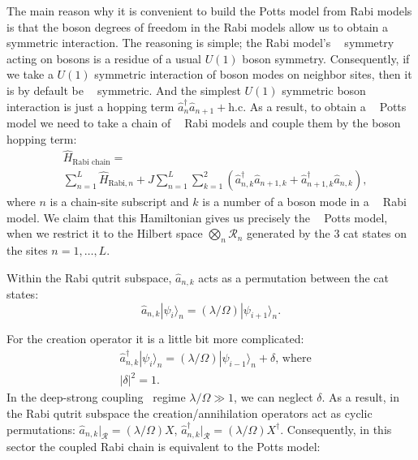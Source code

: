 \documentclass[reprint, aps, prx, amsmath, amssymb, longbibliography, superscriptaddress]{revtex4-2}
\DeclareMathOperator{\Zthree}{\mathbb{Z}_3}
\begin{document}
The main reason why it is convenient to build the Potts model from Rabi models is that the boson degrees of freedom in the Rabi models allow us to obtain a $\Zthree$ symmetric interaction. The reasoning is simple; the Rabi model's $\Zthree$ symmetry acting on bosons is a residue of a usual $U(1)$ boson symmetry. Consequently, if we take a $U(1)$ symmetric interaction of boson modes on neighbor sites, then it is by default be $\Zthree$ symmetric. And the simplest $U(1)$ symmetric boson interaction is just a hopping term $\hat a_n^{\dagger} \hat a_{n+1} + \textrm{h.c.}$ As a result, to obtain a $\Zthree$ Potts model we need to take a chain of $\Zthree$ Rabi models and couple them by the boson hopping term:
\begin{equation}
\label{coupled-rabi}
\begin{aligned}
    &\hat H_{\text{Rabi chain}} = \\
    &\sum\limits_{n=1}^L \hat H_{\text{Rabi}, n} + J \sum\limits_{n=1}^L \sum\limits_{k=1}^2\left( \hat a_{n,k}^{\dagger} \hat a_{n+1,k} + \hat a_{n+1,k}^{\dagger} \hat a_{n,k}\right),
\end{aligned}
\end{equation}
where $n$ is a chain-site subscript and $k$ is a number of a boson mode in a $ \Zthree $ Rabi model. We claim that this Hamiltonian gives us precisely the $\Zthree$ Potts model, when we restrict it to the Hilbert space $\bigotimes_n\mathcal{R}_n$ generated by the 3 cat states on the sites $n=1,\dots,L$.

Within the Rabi qutrit subspace,  $\hat a_{n,k}$ acts as a permutation between the cat states:
\begin{equation}
    \hat a_{n,k} |\psi_i\rangle_n = (\lambda/\Omega)|\psi_{i+1}\rangle_n. 
\end{equation}

For the creation operator it is a little bit more complicated:
\begin{equation}
\begin{aligned}
    &\hat a_{n,k}^{\dagger} |\psi_i\rangle_n =  (\lambda/\Omega)|\psi_{i-1}\rangle_n + \delta, \,\text{where} \\
    &|\delta|^2 = 1.
\end{aligned}
\end{equation}
In the deep-strong coupling~\cite{PhysRevB.111.035410,kozin2025schottkyanomalycavitycoupleddouble} regime $\lambda/\Omega \gg 1$, we can neglect $\delta$. As a result, in the Rabi qutrit subspace the creation/annihilation operators act as cyclic permutations: $\hat a_{n,k}|_{\mathcal{R}} = (\lambda/\Omega) X$, $\hat a_{n,k}^{\dagger}|_{\mathcal{R}} = (\lambda/\Omega) X^{\dagger}$. Consequently, in this sector the coupled Rabi chain is equivalent to the Potts model:
\end{document}
